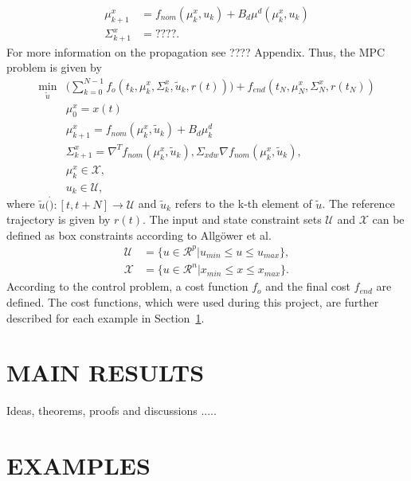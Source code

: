 \documentclass[letterpaper, 10 pt, conference]{ieeeconf}  %
\begin{document}
\begin{align}
\mu^x_{k+1}&= f_{nom}(\mu^x_k,u_k)+B_d \mu^d(\mu^x_k,u_k)\\
\Sigma^x_{k+1} &= ????.
\end{align}
For more information on the propagation see ???? Appendix.
Thus, the MPC problem is given by
\begin{align}
\min_{\tilde{u}} &\big(\sum_{k=0}^{N-1} f_o(t_k,\mu^x_k,\Sigma^x_k,\tilde{u}_k,r(t))\big) + f_{end}(t_N,\mu^x_N,\Sigma^x_N,r(t_N))\\
&\mu^x_0 = x(t)\\
&\mu^x_{k+1}= f_{nom}(\mu^x_k,\tilde{u}_k)+B_d \mu^d_k\\
&\Sigma^x_{k+1}=\nabla^T  f_{nom}(\mu^x_k,\tilde{u}_k),\Sigma_{xdw} \nabla f_{nom}(\mu^x_k,\tilde{u}_k),\\
&\mu^x_k \in \mathcal{X},\\
&u_k \in \mathcal{U},
\end{align}
where $\tilde{u}(\dot):[t,t+N] \rightarrow \mathcal{U}$ and $\tilde{u}_k$ refers to the k-th element of $\tilde{u}$. The reference trajectory is given by $r(t)$. The input and state constraint sets $\mathcal{U}$ and $\mathcal{X}$ can be defined as box constraints according to Allgöwer et al.~\cite{allgeowernonlinear}
\begin{align}
\mathcal{U} &= \{u \in \mathcal{R}^p|u_{min}\leq u \leq u_{max}\},\\
\mathcal{X} &= \{u \in \mathcal{R}^n|x_{min}\leq x \leq x_{max}\}.
\end{align}
According to the control problem, a cost function $f_o$ and the final cost $f_{end}$ are defined. The cost functions, which were used during this project, are further described for each example in Section~\ref{main_results}.



\section{MAIN RESULTS}\label{main_results}

Ideas, theorems, proofs and discussions .....


\section{EXAMPLES}\label{examples}
\end{document}
